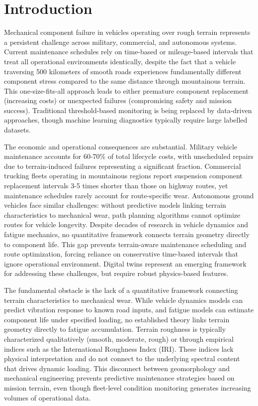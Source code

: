 \documentclass[11pt]{article}
\begin{document}
\newpage


\section*{Introduction}

Mechanical component failure in vehicles operating over rough terrain represents a persistent challenge across military, commercial, and autonomous systems. Current maintenance schedules rely on time-based or mileage-based intervals that treat all operational environments identically, despite the fact that a vehicle traversing 500 kilometers of smooth roads experiences fundamentally different component stress compared to the same distance through mountainous terrain. This one-size-fits-all approach leads to either premature component replacement (increasing costs) or unexpected failures (compromising safety and mission success). Traditional threshold-based monitoring is being replaced by data-driven approaches\cite{Chen2024}, though machine learning diagnostics typically require large labelled datasets\cite{Lei2020}.

The economic and operational consequences are substantial. Military vehicle maintenance accounts for 60-70\% of total lifecycle costs, with unscheduled repairs due to terrain-induced failures representing a significant fraction. Commercial trucking fleets operating in mountainous regions report suspension component replacement intervals 3-5 times shorter than those on highway routes, yet maintenance schedules rarely account for route-specific wear. Autonomous ground vehicles face similar challenges: without predictive models linking terrain characteristics to mechanical wear, path planning algorithms cannot optimize routes for vehicle longevity\cite{Yurtsever2020}. Despite decades of research in vehicle dynamics and fatigue mechanics, no quantitative framework connects terrain geometry directly to component life. This gap prevents terrain-aware maintenance scheduling and route optimization, forcing reliance on conservative time-based intervals that ignore operational environment. Digital twins represent an emerging framework\cite{Li2023} for addressing these challenges, but require robust physics-based features.

The fundamental obstacle is the lack of a quantitative framework connecting terrain characteristics to mechanical wear. While vehicle dynamics models can predict vibration response to known road inputs\cite{Wong2022,Gillespie1992}, and fatigue models can estimate component life under specified loading\cite{Basquin1910,Dowling2013}, no established theory links terrain geometry directly to fatigue accumulation. Terrain roughness is typically characterized qualitatively (smooth, moderate, rough) or through empirical indices such as the International Roughness Index (IRI)\cite{ISO8608}. These indices lack physical interpretation and do not connect to the underlying spectral content that drives dynamic loading. This disconnect between geomorphology and mechanical engineering prevents predictive maintenance strategies based on mission terrain, even though fleet-level condition monitoring generates increasing volumes of operational data\cite{Zhu2019}.
\end{document}
